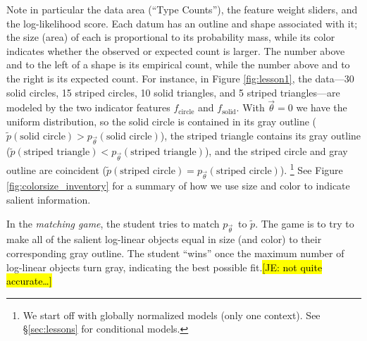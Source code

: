 \documentclass[11pt,letterpaper]{article}
\newcommand{\Note}[1]{}
\renewcommand{\Note}[1]{\hl{[#1]}}  %
\newcommand{\NoteSigned}[3]{{\sethlcolor{#2}\Note{#1: #3}}}
\newcommand{\NoteJE}[1]{\NoteSigned{JE}{LightGreen}{#1}}
\newcommand{\Commented}[1]{#1}
\newcommand{\empirical}[0]{\ensuremath{\tilde{p}}}
\begin{document}

Note in particular the data area (``Type Counts''), the
feature weight sliders, and the log-likelihood score. 
Each datum has an outline and shape associated with it; the size (area) of
each is proportional to its probability mass, while its color
indicates whether the observed or expected count is larger.  The
number above and to the left of a shape is its empirical
count, while the number above and to the right is its expected count.
For instance, in Figure \ref{fig:lesson1}, the data---30 solid
circles, 15 striped circles, 10 solid triangles, and 5 striped
triangles---are modeled by the two indicator features
$f_{\textrm{circle}}$ and $f_{\textrm{solid}}$. With $\vec{\theta} =
0$ we have the uniform distribution, so the solid circle is contained
in its gray outline ($\empirical{}(\textrm{solid circle}) >
p_{\vec{\theta}}(\textrm{solid circle})$), the striped triangle
contains its gray outline ($\empirical{}(\textrm{striped triangle}) <
p_{\vec{\theta}}(\textrm{striped triangle})$), and the striped
circle and gray outline are coincident ($\empirical{}(\textrm{striped
  circle}) = p_{\vec{\theta}}(\textrm{striped circle})$).
\footnote{We start off with globally normalized models (only one 
context). See \S\ref{sec:lessons} for conditional models.}  
See Figure \ref{fig:colorsize_inventory}
for a summary of how we use size and color to indicate salient
information.

In the \textit{matching game}, the student tries to match $p_{\vec{\theta}}$\ to  $\tilde{p}$. 
The game is to try to make all of the salient log-linear objects 
equal in size (and color) to their corresponding gray outline. The student ``wins'' once the maximum
number of log-linear objects turn gray, indicating the best possible fit.\NoteJE{not quite accurate\ldots}
\end{document}
